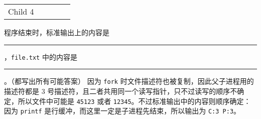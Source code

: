 \begin{problems}
\begin{table}[H]
\begin{tabular}{ccccc}
                \multicolumn{1}{|c|}{Child 4} & \multicolumn{1}{c|}{} & \multicolumn{1}{c|}{} & \multicolumn{1}{c|}{} & \multicolumn{1}{c|}{} \\ \cline{1-1} \cline{3-3} \cline{5-5} 
            \end{tabular}
        \end{table}
        \qn 程序结束时，标准输出上的内容是 \rule{2cm}{0.25mm}，\verb|file.txt| 中的内容是 \rule{2cm}{0.25mm}。（都写出所有可能答案）
        \sol 因为 \verb|fork| 时文件描述符也被复制，因此父子进程用的描述符都是 3 号描述符，且二者共用同一个读写指针，只不过读写的顺序不确定，所以文件中可能是 \verb|45123| 或者 \verb|12345|。不过标准输出中的内容则顺序确定：因为 \verb|printf| 是行缓冲，而这里一定是子进程先结束，所以输出为 \verb|C:3 P:3|。
    \end{problems}

